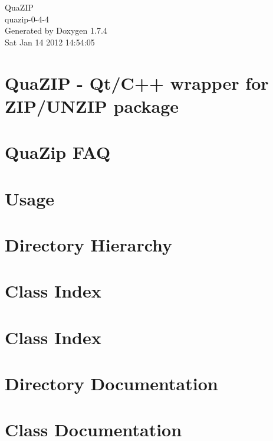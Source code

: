 \documentclass[a4paper]{book}
\begin{document}
\begin{titlepage}
\vspace*{7cm}
\begin{center}
{\Large QuaZIP \\[1ex]\large quazip-\/0-\/4-\/4 }\\
\vspace*{1cm}
{\large Generated by Doxygen 1.7.4}\\
\vspace*{0.5cm}
{\small Sat Jan 14 2012 14:54:05}\\
\end{center}
\end{titlepage}
\clearemptydoublepage
{}
\tableofcontents
\clearemptydoublepage
{}
\chapter{QuaZIP -\/ Qt/C++ wrapper for ZIP/UNZIP package}
\label{index}
\chapter{QuaZip FAQ}
\label{faq}

\chapter{Usage}
\label{usage}

\chapter{Directory Hierarchy}

\chapter{Class Index}

\chapter{Class Index}

\chapter{Directory Documentation}

\chapter{Class Documentation}










\printindex
\end{document}
